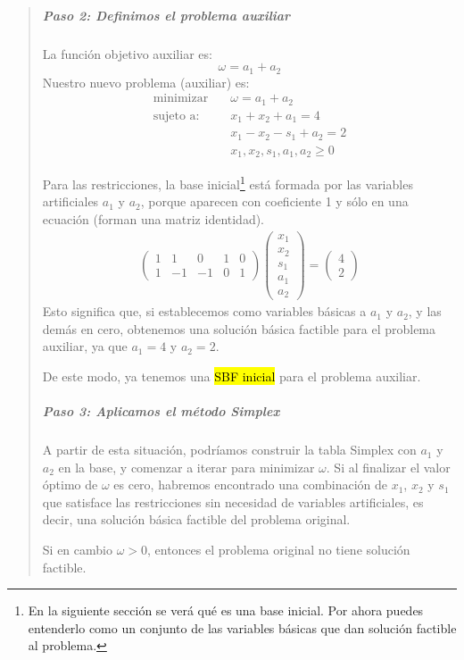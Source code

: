 \begin{quote}
  \subparagraph{Paso 2: Definimos el problema auxiliar}
  
  La función objetivo auxiliar es:
  \[
    \omega = a_1 + a_2
  \]
  Nuestro nuevo problema (auxiliar) es:
  \begin{align*}
    \text{minimizar} \quad  &\omega = a_1 + a_2\\[3pt]
    \text{sujeto a:} \quad  &x_1 + x_2 + a_1 = 4\\
                            &x_1 - x_2 - s_1 + a_2 = 2\\
                            &x_1, x_2, s_1, a_1, a_2 \geq 0
  \end{align*}

  Para las restricciones, la base inicial\footnote{En la siguiente sección se verá qué es una base inicial. Por ahora puedes entenderlo como un conjunto de las variables básicas que dan solución factible al problema.} está formada por las variables artificiales \(a_1\) y \(a_2\), porque aparecen con coeficiente 1 y sólo en una ecuación (forman una matriz identidad).
  \begin{align*}
    \begin{pmatrix}
      1 & 1 & 0 & 1 & 0\\
      1 & -1 & -1 & 0 & 1
    \end{pmatrix}
    \begin{pmatrix}
      x_1\\
      x_2\\
      s_1\\
      a_1\\
      a_2
    \end{pmatrix}
    =
    \begin{pmatrix}
      4\\
      2
    \end{pmatrix}
  \end{align*}
  Esto significa que, si establecemos como variables básicas a \(a_1\) y \(a_2\), y las demás en cero, obtenemos una solución básica factible para el problema auxiliar, ya que \(a_1 = 4\) y \(a_2 = 2\).

  De este modo, ya tenemos una \hl{SBF inicial} para el problema auxiliar.
  
  \subparagraph{Paso 3: Aplicamos el método Simplex}
  
  A partir de esta situación, podríamos construir la tabla Simplex con \(a_1\) y \(a_2\) en la base, y comenzar a iterar para minimizar \(\omega\). Si al finalizar el valor óptimo de \(\omega\) es cero, habremos encontrado una combinación de \(x_1\), \(x_2\) y \(s_1\) que satisface las restricciones sin necesidad de variables artificiales, es decir, una solución básica factible del problema original.
  
  Si en cambio \(\omega > 0\), entonces el problema original no tiene solución factible.  
\end{quote}

